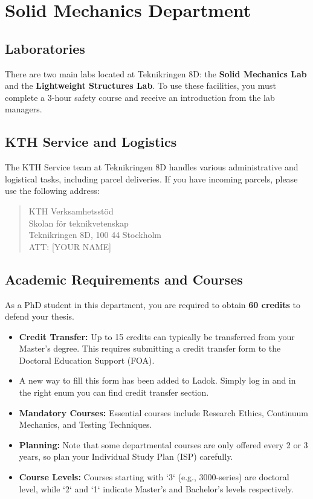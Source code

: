 \section{Solid Mechanics Department}
\label{sec:solid_mechanics}

\subsection{Laboratories}
There are two main labs located at Teknikringen 8D: the \textbf{Solid Mechanics Lab} and the \textbf{Lightweight Structures Lab}. To use these facilities, you must complete a 3-hour safety course and receive an introduction from the lab managers.

\subsection{KTH Service and Logistics}
The KTH Service team at Teknikringen 8D handles various administrative and logistical tasks, including parcel deliveries. If you have incoming parcels, please use the following address:

\begin{quote}
    KTH Verksamhetsstöd\\
    Skolan för teknikvetenskap\\
    Teknikringen 8D, 100 44 Stockholm\\
    ATT: [YOUR NAME]
\end{quote}

\subsection{Academic Requirements and Courses}
As a PhD student in this department, you are required to obtain \textbf{60 credits} to defend your thesis.
\begin{itemize}
    \item \textbf{Credit Transfer:} Up to 15 credits can typically be transferred from your Master's degree. This requires submitting a credit transfer form to the Doctoral Education Support (FOA).
    \item A new way to fill this form has been added to Ladok. Simply log in and in the right enum you can find credit transfer section.
    \item \textbf{Mandatory Courses:} Essential courses include Research Ethics, Continuum Mechanics, and Testing Techniques.
    \item \textbf{Planning:} Note that some departmental courses are only offered every 2 or 3 years, so plan your Individual Study Plan (ISP) carefully.
    \item \textbf{Course Levels:} Courses starting with `3` (e.g., 3000-series) are doctoral level, while `2` and `1` indicate Master's and Bachelor's levels respectively.
\end{itemize}

